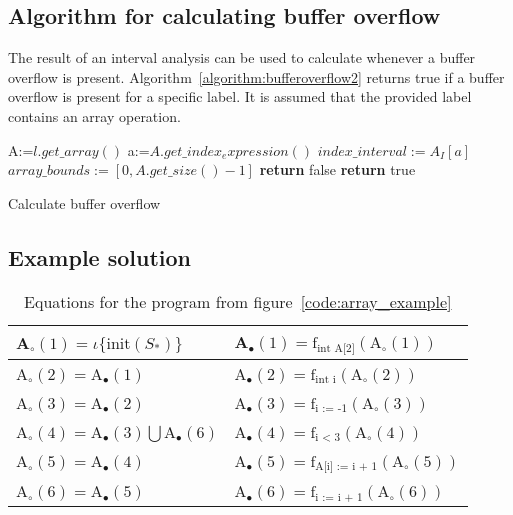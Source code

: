 \subsection{Algorithm for calculating buffer overflow}
The result of an interval analysis can be used to calculate whenever a buffer overflow is present. Algorithm~\ref{algorithm:bufferoverflow2} returns true if a buffer overflow is present for a specific label. It is assumed that the provided label contains an array operation.
\begin{algorithm}
 \begin{algorithmic}[1]
\State A:=$l.get\_array()$
\State a:=$A.get\_index_expression()$
\State $index\_interval:=A_I[a]$
\State $array\_bounds:=[0,A.get\_size()-1]$
\State \textbf{return} false
\Else
\State \textbf{return} true
\EndIf 
 \EndProcedure
 \end{algorithmic}
 \caption{Calculate buffer overflow}
 \label{algorithm:bufferoverflow2}
\end{algorithm}


\subsection{Example solution}
\begin{table}[H]
\begin{tabular}{| l | l |}
\hline
A$_\circ (1) = \iota \{\text{init}(S_*) \} $ & A$_\bullet(1) = \text{f}_{\text{int A[2]}} (\text{A}_\circ (1))$ \\
\hline
A$_\circ (2) =$A$_\bullet(1) $ & A$_\bullet(2) = \text{f}_{\text{int i}} (\text{A}_\circ (2))$ \\
\hline
A$_\circ (3) = $A$_\bullet(2)$ & A$_\bullet(3) = \text{f}_{\text{i := -1}} (\text{A}_\circ (3))$  \\
\hline
A$_\circ (4) = $A$_\bullet(3) \bigcup $A$_\bullet(6) $ & A$_\bullet(4) = \text{f}_{\text{i < 3}} (\text{A}_\circ (4))$ \\
\hline
A$_\circ (5) = $A$_\bullet(4)$ & A$_\bullet(5) = \text{f}_{\text{A[i] := i + 1}} (\text{A}_\circ (5))$ \\
\hline
A$_\circ (6) = $A$_\bullet(5)$ & A$_\bullet(6) = \text{f}_{\text{i := i + 1}} (\text{A}_\circ (6))$ \\

\hline
\end{tabular}
\centering
\caption{Equations for the program from figure~\ref{code:array_example}}
\label{table:}
\end{table}

